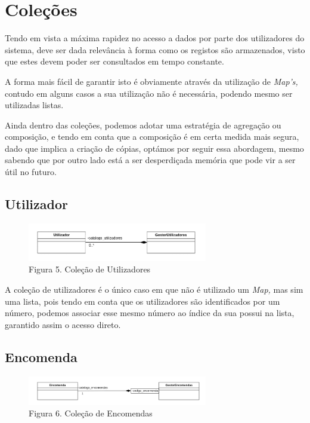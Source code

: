 \chapter{Coleções}

    Tendo em vista a máxima rapidez no acesso a dados por parte dos utilizadores do sistema, deve ser dada relevância à forma como os registos são armazenados, visto que estes devem poder ser consultados em tempo constante.

    A forma mais fácil de garantir isto é obviamente através da utilização de \textit{Map's,} contudo em alguns casos a sua utilização não é necessária, podendo mesmo ser utilizadas listas.

    Ainda dentro das coleções, podemos adotar uma estratégia de agregação ou composição, e tendo em conta que a composição é em certa medida mais segura, dado que implica a criação de cópias, optámos por seguir essa abordagem, mesmo sabendo que por outro lado está a ser desperdiçada memória que pode vir a ser útil no futuro.

    \section{Utilizador}

    \begin{figure}[hb!]
        \centering
        \vspace{-10pt}
        \includegraphics[width=0.7\textwidth]{imagens/5.png}
        \caption*{Figura 5. Coleção de Utilizadores}
    \end{figure}
    \vspace{8pt}

    A coleção de utilizadores é o único caso em que não é utilizado um \textit{Map,} mas sim uma lista, pois tendo em conta que os utilizadores são identificados por um número, podemos associar esse mesmo número ao índice da sua possui na lista, garantido assim o acesso direto.

    \section{Encomenda}

    \begin{figure}[hb!]
        \centering
        \vspace{-5pt}
        \includegraphics[width=0.7\textwidth]{imagens/14.png}
        \caption*{Figura 6. Coleção de Encomendas}
        \vspace{5pt}
    \end{figure}
    \vspace{8pt}

